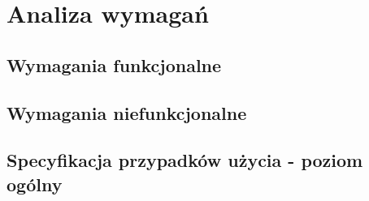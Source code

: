 \section{Analiza wymagań}

\subsection{Wymagania funkcjonalne}
\subsection{Wymagania niefunkcjonalne}
\subsection{Specyfikacja przypadków użycia - poziom ogólny}
